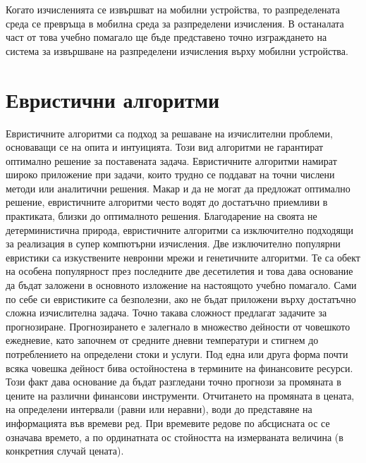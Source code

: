 \documentclass[book,14pt,oneside,openany]{memoir}
\begin{document}
Когато изчисленията се извършват на мобилни устройства, то разпределената среда се превръща в мобилна среда за разпределени изчисления. В останалата част от това учебно помагало ще бъде представено точно изграждането на система за извършване на разпределени изчисления върху мобилни устройства. 

\newpage
\chapter{Евристични алгоритми}
\label{chapter02}

Евристичните алгоритми са подход за решаване на изчислителни проблеми, основаващи се на опита и интуицията. Този вид алгоритми не гарантират оптимално решение за поставената задача. Евристичните алгоритми намират широко приложение при задачи, които трудно се поддават на точни числени методи или аналитични решения. Макар и да не могат да предложат оптимално решение, евристичните алгоритми често водят до достатъчно приемливи в практиката, близки до оптималното решения. Благодарение на своята не детерминистична природа, евристичните алгоритми са изключително подходящи за реализация в супер компютърни изчисления. Две изключително популярни евристики са изкуствените невронни мрежи и генетичните алгоритми. Те са обект на особена популярност през последните две десетилетия и това дава основание да бъдат заложени в основното изложение на настоящото учебно помагало. Сами по себе си евристиките са безполезни, ако не бъдат приложени върху достатъчно сложна изчислителна задача. Точно такава сложност предлагат задачите за прогнозиране. Прогнозирането е залегнало в множество дейности от човешкото ежедневие, като започнем от средните дневни температури и стигнем до потреблението на определени стоки и услуги. Под една или друга форма почти всяка човешка дейност бива остойностена в термините на финансовите ресурси. Този факт дава основание да бъдат разгледани точно прогнози за промяната в цените на различни финансови инструменти. Отчитането на промяната в цената, на определени интервали (равни или неравни), води до представяне на информацията във времеви ред. При времевите редове по абсцисната ос се означава времето, а по ординатната ос стойността на измерваната величина (в конкретния случай цената).
\end{document}
